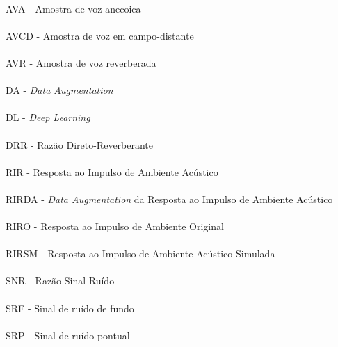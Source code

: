 \paragraph{}AVA - Amostra de voz anecoica
\paragraph{}AVCD - Amostra de voz em campo-distante
\paragraph{}AVR - Amostra de voz reverberada
\paragraph{}DA - \textit{Data Augmentation}
\paragraph{}DL - \textit{Deep Learning}
\paragraph{}DRR - Razão Direto-Reverberante
\paragraph{}RIR - Resposta ao Impulso de Ambiente Acústico
\paragraph{}RIRDA - \textit{Data Augmentation} da Resposta ao Impulso de Ambiente Acústico 
\paragraph{}RIRO - Resposta ao Impulso de Ambiente Original
\paragraph{}RIRSM - Resposta ao Impulso de Ambiente Acústico Simulada
\paragraph{}SNR - Razão Sinal-Ruído
\paragraph{}SRF - Sinal de ruído de fundo
\paragraph{}SRP - Sinal de ruído pontual
